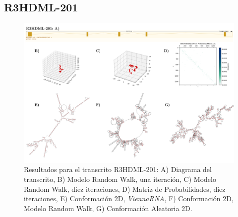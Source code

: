 \documentclass[a4paper,11pt,titlepage]{article}
\theoremstyle{definition}
\begin{document}
\subsection*{R3HDML-201}\label{subsec:gene5}

\begin{figure}[H]
    \centering
    \includegraphics[width=\textwidth]{images/R3HDML-201_full.png}
    \small{\caption{Resultados para el transcrito R3HDML-201: A) Diagrama del transcrito, B) Modelo Random Walk, una iteración, C) Modelo Random Walk, diez iteraciones, D) Matriz de Probabilidades, diez iteraciones, E) Conformación 2D, \textit{ViennaRNA}, F) Conformación 2D, Modelo Random Walk, G) Conformación Aleatoria 2D.}\label{fig:R3HDML-201-diag}}\normalsize
\end{figure}
\end{document}
